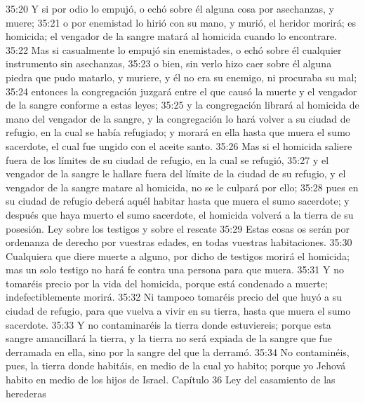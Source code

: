 35:20 Y si por odio lo empujó, o echó sobre él alguna cosa por asechanzas, y muere;  
35:21 o por enemistad lo hirió con su mano, y murió, el heridor morirá; es homicida; el vengador de la sangre matará al homicida cuando lo encontrare. 
35:22 Mas si casualmente lo empujó sin enemistades, o echó sobre él cualquier instrumento sin asechanzas,  
35:23 o bien, sin verlo hizo caer sobre él alguna piedra que pudo matarlo, y muriere, y él no era su enemigo, ni procuraba su mal;  
35:24 entonces la congregación juzgará entre el que causó la muerte y el vengador de la sangre conforme a estas leyes;  
35:25 y la congregación librará al homicida de mano del vengador de la sangre, y la congregación lo hará volver a su ciudad de refugio, en la cual se había refugiado; y morará en ella hasta que muera el sumo sacerdote, el cual fue ungido con el aceite santo.  
35:26 Mas si el homicida saliere fuera de los límites de su ciudad de refugio, en la cual se refugió,  
35:27 y el vengador de la sangre le hallare fuera del límite de la ciudad de su refugio, y el vengador de la sangre matare al homicida, no se le culpará por ello;  
35:28 pues en su ciudad de refugio deberá aquél habitar hasta que muera el sumo sacerdote; y después que haya muerto el sumo sacerdote, el homicida volverá a la tierra de su posesión.  
Ley sobre los testigos y sobre el rescate  
35:29 Estas cosas os serán por ordenanza de derecho por vuestras edades, en todas vuestras habitaciones.  
35:30 Cualquiera que diere muerte a alguno, por dicho de testigos morirá el homicida; mas un solo testigo no hará fe contra una persona para que muera.  
35:31 Y no tomaréis precio por la vida del homicida, porque está condenado a muerte; indefectiblemente morirá.  
35:32 Ni tampoco tomaréis precio del que huyó a su ciudad de refugio, para que vuelva a vivir en su tierra, hasta que muera el sumo sacerdote.  
35:33 Y no contaminaréis la tierra donde estuviereis; porque esta sangre amancillará la tierra, y la tierra no será expiada de la sangre que fue derramada en ella, sino por la sangre del que la derramó.  
35:34 No contaminéis, pues, la tierra donde habitáis, en medio de la cual yo habito; porque yo Jehová habito en medio de los hijos de Israel.  
Capítulo 36
Ley del casamiento de las herederas  

